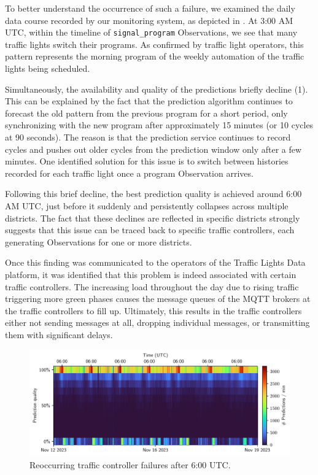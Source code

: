 To better understand the occurrence of such a failure, we examined the daily data course recorded by our monitoring system, as depicted in . At 3:00 AM UTC, within the timeline of \texttt{signal\_program} Observations, we see that many traffic lights switch their programs. As confirmed by traffic light operators, this pattern represents the morning program of the weekly automation of the traffic lights being scheduled.

Simultaneously, the availability and quality of the predictions briefly decline (1). This can be explained by the fact that the prediction algorithm continues to forecast the old pattern from the previous program for a short period, only synchronizing with the new program after approximately 15 minutes (or 10 cycles at 90 seconds). The reason is that the prediction service continues to record cycles and pushes out older cycles from the prediction window only after a few minutes. One identified solution for this issue is to switch between histories recorded for each traffic light once a program Observation arrives.

Following this brief decline, the best prediction quality is achieved around 6:00 AM UTC, just before it suddenly and persistently collapses across multiple districts. The fact that these declines are reflected in specific districts strongly suggests that this issue can be traced back to specific traffic controllers, each generating Observations for one or more districts. 

Once this finding was communicated to the operators of the Traffic Lights Data platform, it was identified that this problem is indeed associated with certain traffic controllers. The increasing load throughout the day due to rising traffic triggering more green phases causes the message queues of the MQTT brokers at the traffic controllers to fill up. Ultimately, this results in the traffic controllers either not sending messages at all, dropping individual messages, or transmitting them with significant delays.

\begin{figure}[t]
    \centering
    \includegraphics[width=\linewidth]{images/monitoring-7-days.pdf}
    \caption{Reoccurring traffic controller failures after 6:00 UTC.}\label{fig:monitoring-7-days}
\end{figure}

